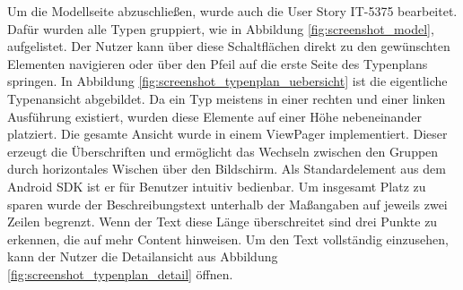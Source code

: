 Um die Modellseite abzuschließen, wurde auch die User Story IT-5375 bearbeitet. Dafür wurden alle Typen gruppiert, wie in Abbildung \ref{fig:screenshot_model}, aufgelistet. Der Nutzer kann über diese Schaltflächen direkt zu den gewünschten Elementen navigieren oder über den Pfeil auf die erste Seite des Typenplans springen. In Abbildung \ref{fig:screenshot_typenplan_uebersicht} ist die eigentliche Typenansicht abgebildet. Da ein Typ meistens in einer rechten und einer linken Ausführung existiert, wurden diese Elemente auf einer Höhe nebeneinander platziert. Die gesamte Ansicht wurde in einem ViewPager implementiert. Dieser erzeugt die Überschriften und ermöglicht das Wechseln zwischen den Gruppen durch horizontales Wischen über den Bildschirm. Als Standardelement aus dem Android \gls{SDK} ist er für Benutzer intuitiv bedienbar. Um insgesamt Platz zu sparen wurde der Beschreibungstext unterhalb der Maßangaben auf jeweils zwei Zeilen begrenzt. Wenn der Text diese Länge überschreitet sind drei Punkte zu erkennen, die auf mehr Content hinweisen. Um den Text vollständig einzusehen, kann der Nutzer die Detailansicht aus Abbildung \ref{fig:screenshot_typenplan_detail} öffnen.

